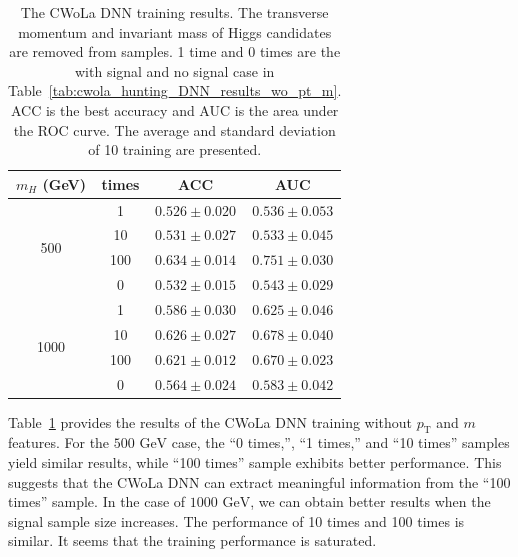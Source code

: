 \documentclass[12pt]{article}
\begin{document}
        \begin{table}[htpb]
            \centering
            \caption{The CWoLa DNN training results. The transverse momentum and invariant mass of Higgs candidates are removed from samples. 1 time and 0 times are the with signal and no signal case in Table~\ref{tab:cwola_hunting_DNN_results_wo_pt_m}. ACC is the best accuracy and AUC is the area under the ROC curve. The average and standard deviation of 10 training are presented.}
            \label{tab:cwola_hunting_DNN_results_wo_pt_m_enlarge_signal_size}
            \begin{tabular}{c|c|cc}
                $m_H$ (GeV)           & times & ACC               & AUC               \\ \hline
                \multirow{4}{*}{500}  & 1     & $0.526 \pm 0.020$ & $0.536 \pm 0.053$ \\
                                      & 10    & $0.531 \pm 0.027$ & $0.533 \pm 0.045$ \\
                                      & 100   & $0.634 \pm 0.014$ & $0.751 \pm 0.030$ \\
                                      & 0     & $0.532 \pm 0.015$ & $0.543 \pm 0.029$ \\ \hline
                \multirow{4}{*}{1000} & 1     & $0.586 \pm 0.030$ & $0.625 \pm 0.046$ \\
                                      & 10    & $0.626 \pm 0.027$ & $0.678 \pm 0.040$ \\
                                      & 100   & $0.621 \pm 0.012$ & $0.670 \pm 0.023$ \\
                                      & 0     & $0.564 \pm 0.024$ & $0.583 \pm 0.042$
            \end{tabular}
        \end{table}

        Table~\ref{tab:cwola_hunting_DNN_results_wo_pt_m_enlarge_signal_size} provides the results of the CWoLa DNN training without $p_{\text{T}}$ and $m$ features. For the $\text{500 GeV}$ case, the ``0 times,'', ``1 times,'' and ``10 times'' samples yield similar results, while ``100 times'' sample exhibits better performance. This suggests that the CWoLa DNN can extract meaningful information from the ``100 times'' sample. In the case of $\text{1000 GeV}$, we can obtain better results when the signal sample size increases. The performance of 10 times and 100 times is similar. It seems that the training performance is saturated.
\end{document}
